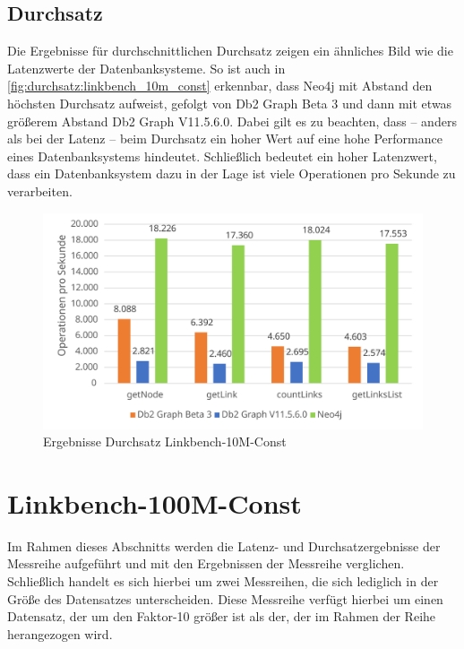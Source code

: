 \subsection{Durchsatz}
Die Ergebnisse für durchschnittlichen Durchsatz zeigen ein ähnliches Bild wie die Latenzwerte der Datenbanksysteme. So ist auch in \autoref{fig:durchsatz:linkbench_10m_const} erkennbar, dass Neo4j mit Abstand den höchsten Durchsatz aufweist, gefolgt von Db2 Graph Beta 3 und dann mit etwas größerem Abstand Db2 Graph V11.5.6.0. Dabei gilt es zu beachten, dass -- anders als bei der Latenz -- beim Durchsatz ein hoher Wert auf eine hohe Performance eines Datenbanksystems hindeutet. Schließlich bedeutet ein hoher Latenzwert, dass ein Datenbanksystem dazu in der Lage ist viele Operationen pro Sekunde zu verarbeiten.  

\begin{figure}[!ht]
    \centering
    \includegraphics[width=\textwidth]{images/diagramme/linkbench_10m_const_durchsatz.pdf}
    \caption{Ergebnisse Durchsatz Linkbench-10M-Const}
    \label{fig:durchsatz:linkbench_10m_const}
\end{figure}

\section{Linkbench-100M-Const}
\label{ergebnisse:100m_const}
Im Rahmen dieses Abschnitts werden die Latenz- und Durchsatzergebnisse der Messreihe  aufgeführt und mit den Ergebnissen der Messreihe  verglichen. Schließlich handelt es sich hierbei um zwei Messreihen, die sich lediglich in der Größe des Datensatzes unterscheiden. Diese Messreihe verfügt hierbei um einen Datensatz, der um den Faktor-10 größer ist als der, der im Rahmen der Reihe  herangezogen wird. 

